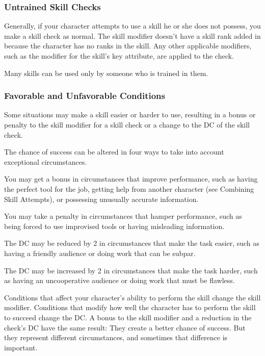 \subsubsection{Untrained Skill Checks}
Generally, if your character attempts to use a skill he or she does not possess, you make a skill check as normal. The skill modifier doesn't have a skill rank added in because the character has no ranks in the skill. Any other applicable modifiers, such as the modifier for the skill's key attribute, are applied to the check.

Many skills can be used only by someone who is trained in them.

\subsubsection{Favorable and Unfavorable Conditions}
Some situations may make a skill easier or harder to use, resulting in a bonus or penalty to the skill modifier for a skill check or a change to the DC of the skill check.

The chance of success can be altered in four ways to take into account exceptional circumstances.
\begin{enumerate*}
\item You may get a  bonus in circumstances that improve performance, such as having the perfect tool for the job, getting help from another character (see Combining Skill Attempts), or possessing unusually accurate information.
\item You may take a  penalty in circumstances that hamper performance, such as being forced to use improvised tools or having misleading information.
\item The DC may be reduced by 2 in circumstances that make the task easier, such as having a friendly audience or doing work that can be subpar.
\item  The DC may be increased by 2 in circumstances that make the task harder, such as having an uncooperative audience or doing work that must be flawless.
\end{enumerate*}

Conditions that affect your character's ability to perform the skill change the skill modifier. Conditions that modify how well the character has to perform the skill to succeed change the DC. A bonus to the skill modifier and a reduction in the check's DC have the same result: They create a better chance of success. But they represent different circumstances, and sometimes that difference is important.

